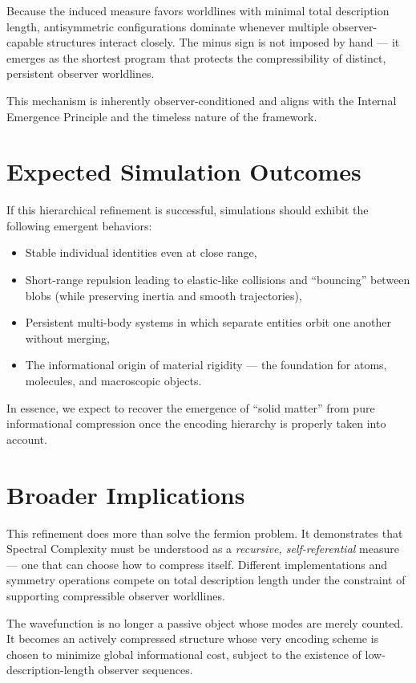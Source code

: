 Because the induced measure favors worldlines with minimal total description length, antisymmetric configurations dominate whenever multiple observer-capable structures interact closely.
The minus sign is not imposed by hand — it emerges as the shortest program that protects the compressibility of distinct, persistent observer worldlines.

This mechanism is inherently observer-conditioned and aligns with the Internal Emergence Principle and the timeless nature of the framework.

\section{Expected Simulation Outcomes}

If this hierarchical refinement is successful, simulations should exhibit the following emergent behaviors:
\begin{itemize}
\item Stable individual identities even at close range,
\item Short-range repulsion leading to elastic-like collisions and ``bouncing'' between blobs (while preserving inertia and smooth trajectories),
\item Persistent multi-body systems in which separate entities orbit one another without merging,
\item The informational origin of material rigidity — the foundation for atoms, molecules, and macroscopic objects.
\end{itemize}

In essence, we expect to recover the emergence of ``solid matter'' from pure informational compression once the encoding hierarchy is properly taken into account.

\section{Broader Implications}

This refinement does more than solve the fermion problem.
It demonstrates that Spectral Complexity must be understood as a \emph{recursive, self-referential} measure — one that can choose how to compress itself.
Different implementations and symmetry operations compete on total description length under the constraint of supporting compressible observer worldlines.

The wavefunction is no longer a passive object whose modes are merely counted.
It becomes an actively compressed structure whose very encoding scheme is chosen to minimize global informational cost, subject to the existence of low-description-length observer sequences.

